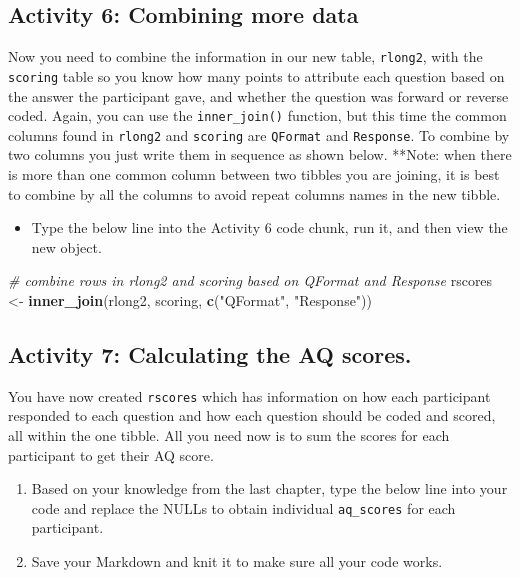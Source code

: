 \documentclass[]{book}
\newenvironment{Shaded}{\begin{snugshade}}{\end{snugshade}}
\newcommand{\CommentTok}[1]{\textcolor[rgb]{0.56,0.35,0.01}{\textit{#1}}}
\newcommand{\KeywordTok}[1]{\textcolor[rgb]{0.13,0.29,0.53}{\textbf{#1}}}
\newcommand{\NormalTok}[1]{#1}
\newcommand{\StringTok}[1]{\textcolor[rgb]{0.31,0.60,0.02}{#1}}
\providecommand{\tightlist}{%
  \setlength{\itemsep}{0pt}\setlength{\parskip}{0pt}}
\begin{document}
\hypertarget{activity-6-combining-more-data}{%
\subsection{Activity 6: Combining more data}\label{activity-6-combining-more-data}}

Now you need to combine the information in our new table, \texttt{rlong2}, with the \texttt{scoring} table so you know how many points to attribute each question based on the answer the participant gave, and whether the question was forward or reverse coded. Again, you can use the \texttt{inner\_join()} function, but this time the common columns found in \texttt{rlong2} and \texttt{scoring} are \texttt{QFormat} and \texttt{Response}. To combine by two columns you just write them in sequence as shown below. **Note: when there is more than one common column between two tibbles you are joining, it is best to combine by all the columns to avoid repeat columns names in the new tibble.

\begin{itemize}
\tightlist
\item
  Type the below line into the Activity 6 code chunk, run it, and then view the new object.
\end{itemize}

\begin{Shaded}
\begin{Highlighting}[]
\CommentTok{# combine rows in rlong2 and scoring based on QFormat and Response}
\NormalTok{rscores <-}\StringTok{ }\KeywordTok{inner_join}\NormalTok{(rlong2, scoring, }\KeywordTok{c}\NormalTok{(}\StringTok{"QFormat"}\NormalTok{, }\StringTok{"Response"}\NormalTok{))}
\end{Highlighting}
\end{Shaded}

\hypertarget{activity-7-calculating-the-aq-scores.}{%
\subsection{Activity 7: Calculating the AQ scores.}\label{activity-7-calculating-the-aq-scores.}}

You have now created \texttt{rscores} which has information on how each participant responded to each question and how each question should be coded and scored, all within the one tibble. All you need now is to sum the scores for each participant to get their AQ score.

\begin{enumerate}
\def\labelenumi{\arabic{enumi}.}
\tightlist
\item
  Based on your knowledge from the last chapter, type the below line into your code and replace the NULLs to obtain individual \texttt{aq\_scores} for each participant.\\
\item
  Save your Markdown and knit it to make sure all your code works.
\end{enumerate}
\end{document}
